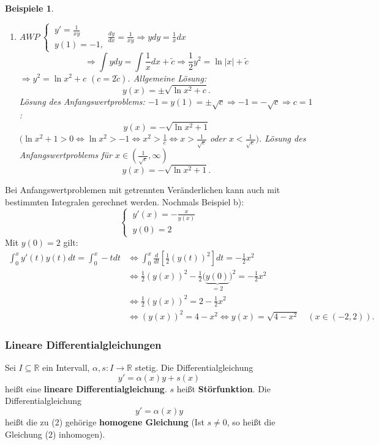 \documentclass[12pt]{extreport} %
\newcommand{\R}{\mathbb{R}}
\theoremstyle{named}
\theoremstyle{nnamed}
\theoremstyle{itshape}
\theoremstyle{normal}
\newtheorem*{beispiele}{Beispiele}
\begin{document}
\begin{beispiele}
\begin{enumerate}
			$$ y(x) = - \log (\cos x). $$
		\item $AWP ~ \begin{cases} ~ y' = \frac{1}{xy} \\ ~ y(1) = -1, \end{cases} \frac{dy}{dx} = \frac{1}{xy} \Rightarrow y dy = \frac{1}{x} dx$
			$$ \Longrightarrow \int y dy = \int \frac{1}{x} dx + \tilde{c} \Longrightarrow \frac{1}{2} y^{2} = \ln |x| + \tilde{c} $$
			$\Rightarrow y^{2} = \ln x^{2} + c$ $(c = 2 \tilde{c})$. Allgemeine Lösung:
			$$ y(x) = \pm \sqrt{\ln x^{2} + c}. $$
			Lösung des Anfangswertproblems: $-1 = y(1) = \pm \sqrt{c} \Rightarrow -1 = -\sqrt{c} \Rightarrow c = 1$:
			$$ y(x) = - \sqrt{\ln x^{2} + 1} $$
			$(\ln x^{2} + 1 > 0 \iff \ln x^{2} > -1 \iff x^{2} > \frac{1}{e} \iff x > \frac{1}{\sqrt{e}}$ oder $x < \frac{1}{\sqrt{e}})$. Lösung des Anfangswertproblems für $x \in \left( \frac{1}{\sqrt{e}}, \infty \right)$
			 $$ y(x) = - \sqrt{\ln x^{2} + 1}. $$
	\end{enumerate}	
\end{beispiele}

Bei Anfangswertproblemen mit getrennten Veränderlichen kann auch mit bestimmten Integralen gerechnet werden. Nochmals Beispiel b): 
$$ \begin{cases} ~ y'(x) = -\frac{x}{y(x)} \\ ~ y(0) = 2 \end{cases} $$
Mit $y(0) = 2$ gilt:
\begin{align*}
	\int_{0}^{x} y'(t) y(t) dt = \int_{0}^{x} - t dt & \iff \int_{0}^{x} \frac{d}{dt} \left[ \frac{1}{2} \left( y(t) \right)^{2} \right] dt = -\frac{1}{2} x^{2} \\
	& \iff \frac{1}{2} \left( y(x) \right)^{2} - \frac{1}{2} \big( \underbrace{y(0)}_{=2} \big)^{2} = - \frac{1}{2} x^{2} \\
	& \iff \frac{1}{2} \left( y(x) \right)^{2} = 2 - \frac{1}{2} x^{2} \\
	& \iff \left( y(x) \right)^{2} = 4 - x^{2} \iff y(x) = \sqrt{4 - x^{2}} \quad (x \in (-2, 2)).
\end{align*}

     
\subsubsection*{Lineare Differentialgleichungen}
Sei $I \subseteq \R$ ein Intervall, $\alpha, s \colon I \rightarrow \R$ stetig. Die Differentialgleichung
	\begin{equation*}
		y' = \alpha(x) y + s(x) \tag*{(2)}
	\end{equation*}
hei{\ss}t eine \textbf{lineare Differentialgleichung}. $s$ hei{\ss}t \textbf{Störfunktion}. Die Differentialgleichung
	\begin{equation*}
		y' = \alpha(x) y \tag*{(3)}
	\end{equation*}
	hei{\ss}t die zu (2) gehörige \textbf{homogene Gleichung} (Ist $s \neq 0$, so hei{\ss}t die Gleichung (2) inhomogen).
\end{document}
